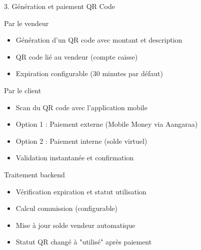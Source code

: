\documentclass[aspectratio=169,9pt,demo]{beamer}
\begin{document}
\begin{frame}{3. Génération et paiement QR Code}
\begin{block}{Par le vendeur}
\begin{itemize}
    \item Génération d'un QR code avec montant et description
    \item QR code lié au vendeur (compte caisse)
    \item Expiration configurable (30 minutes par défaut)
\end{itemize}
\end{block}

\begin{block}{Par le client}
\begin{itemize}
    \item Scan du QR code avec l'application mobile
    \item Option 1 : Paiement externe (Mobile Money via Aangaraa)
    \item Option 2 : Paiement interne (solde virtuel)
    \item Validation instantanée et confirmation
\end{itemize}
\end{block}

\begin{block}{Traitement backend}
\begin{itemize}
    \item Vérification expiration et statut utilisation
    \item Calcul commission (configurable)
    \item Mise à jour solde vendeur automatique
    \item Statut QR changé à "utilisé" après paiement
\end{itemize}
\end{block}
\end{frame}
\end{document}
